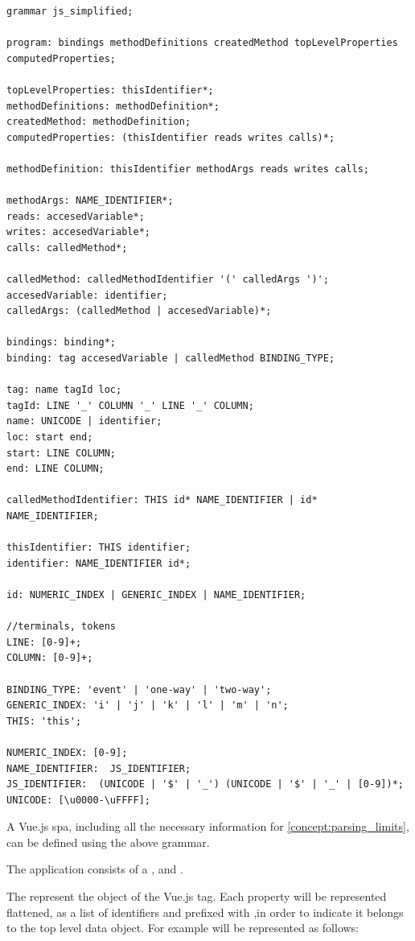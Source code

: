 \begin{lstlisting}[style=antrl]
grammar js_simplified;

program: bindings methodDefinitions createdMethod topLevelProperties computedProperties;

topLevelProperties: thisIdentifier*;
methodDefinitions: methodDefinition*; 
createdMethod: methodDefinition;
computedProperties: (thisIdentifier reads writes calls)*;

methodDefinition: thisIdentifier methodArgs reads writes calls;

methodArgs: NAME_IDENTIFIER*;
reads: accesedVariable*;
writes: accesedVariable*;
calls: calledMethod*;

calledMethod: calledMethodIdentifier '(' calledArgs ')';
accesedVariable: identifier;
calledArgs: (calledMethod | accesedVariable)*;

bindings: binding*;
binding: tag accesedVariable | calledMethod BINDING_TYPE;

tag: name tagId loc;
tagId: LINE '_' COLUMN '_' LINE '_' COLUMN;
name: UNICODE | identifier;
loc: start end;
start: LINE COLUMN;
end: LINE COLUMN;

calledMethodIdentifier: THIS id* NAME_IDENTIFIER | id* NAME_IDENTIFIER;

thisIdentifier: THIS identifier;
identifier: NAME_IDENTIFIER id*;
    
id: NUMERIC_INDEX | GENERIC_INDEX | NAME_IDENTIFIER;

//terminals, tokens
LINE: [0-9]+;
COLUMN: [0-9]+;

BINDING_TYPE: 'event' | 'one-way' | 'two-way';
GENERIC_INDEX: 'i' | 'j' | 'k' | 'l' | 'm' | 'n';
THIS: 'this';

NUMERIC_INDEX: [0-9];
NAME_IDENTIFIER:  JS_IDENTIFIER;
JS_IDENTIFIER:  (UNICODE | '$' | '_') (UNICODE | '$' | '_' | [0-9])*;
UNICODE: [\u0000-\uFFFF];
\end{lstlisting}

A Vue.js \gls{spa}, including all the necessary information for \ref{concept:parsing_limits}, can be defined using the above grammar. 

The application consists of   a ,  and . 

The  represent the  object of the Vue.js  tag. Each property will be represented flattened, as a list of identifiers and prefixed with ,in order to indicate it belongs to the top level data object. For example  will be represented as follows:

